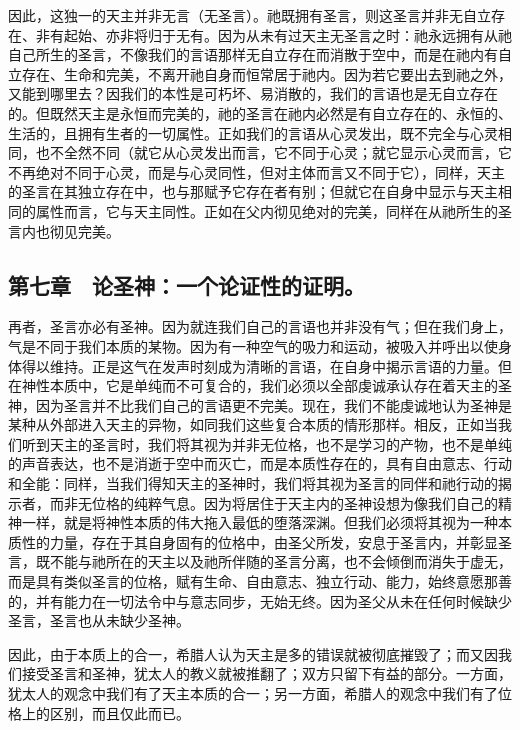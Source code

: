 因此，这独一的天主并非无言（无圣言）。祂既拥有圣言，则这圣言并非无自立存在、非有起始、亦非将归于无有。因为从未有过天主无圣言之时：祂永远拥有从祂自己所生的圣言，不像我们的言语那样无自立存在而消散于空中，而是在祂内有自立存在、生命和完美，不离开祂自身而恒常居于祂内。因为若它要出去到祂之外，又能到哪里去？因我们的本性是可朽坏、易消散的，我们的言语也是无自立存在的。但既然天主是永恒而完美的，祂的圣言在祂内必然是有自立存在的、永恒的、生活的，且拥有生者的一切属性。正如我们的言语从心灵发出，既不完全与心灵相同，也不全然不同（就它从心灵发出而言，它不同于心灵；就它显示心灵而言，它不再绝对不同于心灵，而是与心灵同性，但对主体而言又不同于它），同样，天主的圣言在其独立存在中，也与那赋予它存在者有别；但就它在自身中显示与天主相同的属性而言，它与天主同性。正如在父内彻见绝对的完美，同样在从祂所生的圣言内也彻见完美。\par


\subsection{第七章　论圣神：一个论证性的证明。}

再者，圣言亦必有圣神。因为就连我们自己的言语也并非没有气；但在我们身上，气是不同于我们本质的某物。因为有一种空气的吸力和运动，被吸入并呼出以使身体得以维持。正是这气在发声时刻成为清晰的言语，在自身中揭示言语的力量。但在神性本质中，它是单纯而不可复合的，我们必须以全部虔诚承认存在着天主的圣神，因为圣言并不比我们自己的言语更不完美。现在，我们不能虔诚地认为圣神是某种从外部进入天主的异物，如同我们这些复合本质的情形那样。相反，正如当我们听到天主的圣言时，我们将其视为并非无位格，也不是学习的产物，也不是单纯的声音表达，也不是消逝于空中而灭亡，而是本质性存在的，具有自由意志、行动和全能：同样，当我们得知天主的圣神时，我们将其视为圣言的同伴和祂行动的揭示者，而非无位格的纯粹气息。因为将居住于天主内的圣神设想为像我们自己的精神一样，就是将神性本质的伟大拖入最低的堕落深渊。但我们必须将其视为一种本质性的力量，存在于其自身固有的位格中，由圣父所发，安息于圣言内，并彰显圣言，既不能与祂所在的天主以及祂所伴随的圣言分离，也不会倾倒而消失于虚无，而是具有类似圣言的位格，赋有生命、自由意志、独立行动、能力，始终意愿那善的，并有能力在一切法令中与意志同步，无始无终。因为圣父从未在任何时候缺少圣言，圣言也从未缺少圣神。\par

因此，由于本质上的合一，希腊人认为天主是多的错误就被彻底摧毁了；而又因我们接受圣言和圣神，犹太人的教义就被推翻了；双方只留下有益的部分。一方面，犹太人的观念中我们有了天主本质的合一；另一方面，希腊人的观念中我们有了位格上的区别，而且仅此而已。\par

